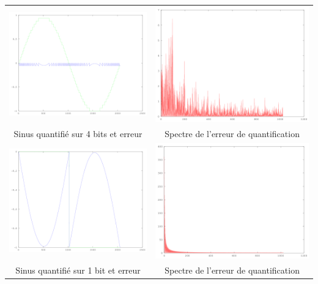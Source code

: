 \documentclass{article}
\begin{document}
\begin{tabular}{c c}
\includegraphics[width = 8 cm]{err_quantif_4bit_t.png} & \includegraphics[width = 8 cm]{err_quantif_4bit_f.png}
\\
Sinus quantifié sur 4 bits et erreur & Spectre de l'erreur de quantification
\\
\includegraphics[width = 8 cm]{err_quantif_1bit_t.png} & \includegraphics[width = 8 cm]{err_quantif_1bit_f.png}
\\
Sinus quantifié sur 1 bit et erreur & Spectre de l'erreur de quantification
\end{tabular}
\end{document}
